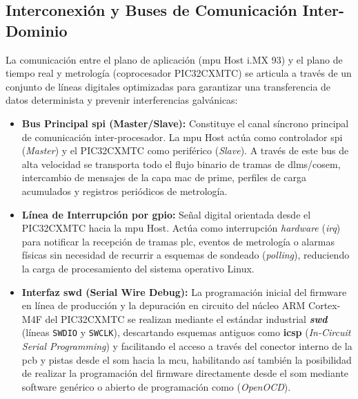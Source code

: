 \subsection{Interconexión y Buses de Comunicación Inter-Dominio}
\label{subsec:interconexion_buses}

La comunicación entre el plano de aplicación (\gls{mpu} Host i.MX 93) y el plano de tiempo real y metrología (coprocesador PIC32CXMTC) se articula a través de un conjunto de líneas digitales optimizadas para garantizar una transferencia de datos determinista y prevenir interferencias galvánicas:

\begin{itemize}
    \item \textbf{Bus Principal \gls{spi} (Master/Slave):} Constituye el canal síncrono principal de comunicación inter-procesador. La \gls{mpu} Host actúa como controlador \gls{spi} (\textit{Master}) y el PIC32CXMTC como periférico (\textit{Slave}). A través de este bus de alta velocidad se transporta todo el flujo binario de tramas de  \gls{dlms}/\gls{cosem}, intercambio de mensajes de la capa \gls{mac} de \gls{prime}, perfiles de carga acumulados y registros periódicos de metrología.

    \item \textbf{Línea de Interrupción por \gls{gpio}:} Señal digital orientada desde el PIC32CXMTC hacia la \gls{mpu} Host. Actúa como interrupción \textit{hardware} (\textit{\gls{irq}}) para notificar la recepción de tramas \gls{plc}, eventos de metrología o alarmas físicas sin necesidad de recurrir a esquemas de sondeado (\textit{polling}), reduciendo la carga de procesamiento del sistema operativo Linux.

    \item \textbf{Interfaz \gls{swd} (Serial Wire Debug):} La programación inicial del firmware en línea de producción y la depuración en circuito del núcleo ARM Cortex-M4F del PIC32CXMTC se realizan mediante el estándar industrial \textit{\textbf{\gls{swd}}} (líneas \texttt{SWDIO} y \texttt{SWCLK}), descartando esquemas antiguos como \textbf{\gls{icsp}} (\textit{In-Circuit Serial Programming}) y facilitando el acceso a través del conector interno de la \gls{pcb} y pistas desde el \gls{som} hacia la \gls{mcu}, habilitando así también la posibilidad de realizar la programación del firmware directamente desde el \gls{som} mediante software genérico o abierto de programación como (\textit{OpenOCD}).


\end{itemize}
